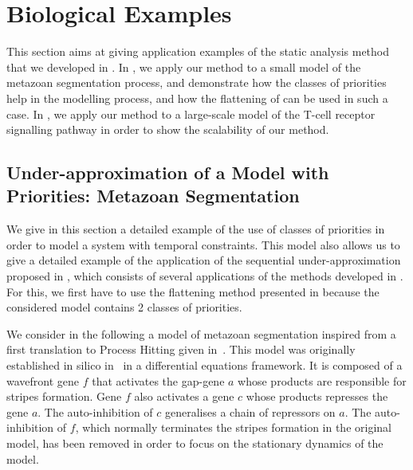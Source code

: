 
\section{Biological Examples}\label{sec:example}

This section aims at giving application examples of the static analysis method
that we developed in .
In , we apply our method to a small model of the
metazoan segmentation process,
and demonstrate how the classes of priorities help in the modelling process,
and how the flattening of 
can be used in such a case.
In , we apply our method to a large-scale model
of the T-cell receptor signalling pathway
in order to show the scalability of our method.



\subsection{Under-approximation of a Model with Priorities: Metazoan Segmentation}
\label{ssec:ex-metazoan}


We give in this section a detailed example of the use of classes of priorities
in order to model a system with temporal constraints.
This model also allows us to give a detailed example of the application of the sequential
under-approximation proposed in ,
which consists of several applications of the methods developed in
.
For this, we first have to use the flattening method presented in 
because the considered model contains 2 classes of priorities.

We consider in the following a model of metazoan segmentation
inspired from a first translation to Process Hitting given in~\cite{PMR10-TCSB}.
This model was originally established in silico in~\cite{MSB:MSB4100192}
in a differential equations framework.
It is composed of a wavefront gene $f$ that activates the gap-gene $a$ whose products are responsible for stripes formation.
Gene $f$ also activates a gene $c$ whose products represses the gene $a$.
The auto-inhibition of $c$ generalises a chain of repressors on $a$.
The auto-inhibition of $f$, which normally terminates
the stripes formation in the original model,
has been removed in order to focus on the stationary dynamics of the model.

